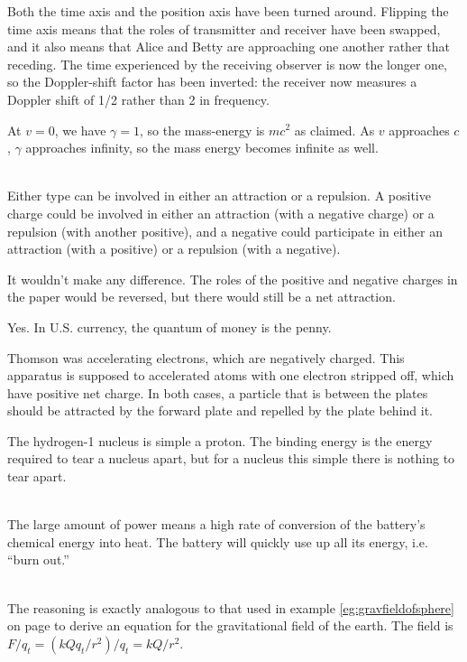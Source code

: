 Both the time axis and the position axis have been turned around. Flipping the time axis
means that the roles of transmitter and receiver have been swapped, and it also means
that Alice and Betty are approaching one another rather that receding. The time experienced
by the receiving observer is now the longer one, so the Doppler-shift factor has been
inverted: the receiver now measures a Doppler shift of 1/2 rather than 2 in frequency.

At $v=0$, we have $\gamma=1$, so the mass-energy is $mc^2$ as claimed. As $v$ approaches
$c$, $\gamma$ approaches infinity, so the mass energy becomes infinite as well.

\noindent{}\\
 Either type can be involved in either an attraction or a
repulsion. A positive charge could be involved in either an attraction (with a negative
charge) or a repulsion (with another positive), and a negative could participate
in either an attraction (with a positive) or a repulsion (with a negative).

 It wouldn't make any difference. The roles of the positive and
negative charges in the paper would be reversed, but there would still be a net attraction.

 Yes. In U.S. currency, the quantum of money is the penny.

 Thomson was accelerating electrons, which are negatively
charged. This apparatus is supposed to accelerated atoms with one electron stripped off,
which have positive net charge. In both cases, a particle that is between the plates
should be attracted by the forward plate and repelled by the plate behind it.

 The hydrogen-1 nucleus is simple a proton. The binding energy
is the energy required to tear a nucleus apart, but for a nucleus this simple there is
nothing to tear apart.

\noindent{}\\
 The large amount of power means a high rate of conversion of the
battery's chemical energy into heat. The battery will quickly use up all its energy, i.e.
``burn out.''

\noindent{}\\
 The reasoning is exactly analogous to that used in
example  \ref{eg:gravfieldofsphere} on page \pageref{eg:gravfieldofsphere} to
derive an equation for the gravitational field of the earth. The field is
$F/q_t=(kQq_t/r^2)/q_t=kQ/r^2$.

